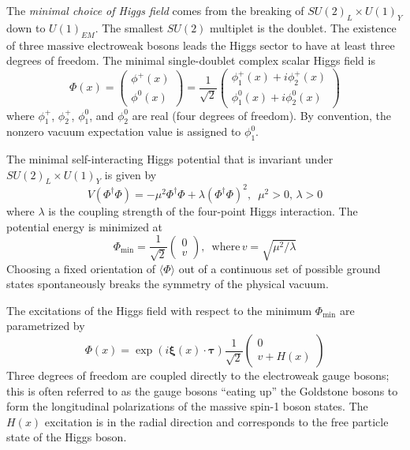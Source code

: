 \documentclass{article}
\begin{document}
The \textit{minimal choice of Higgs field} comes from the breaking of $SU(2)_L \times U(1)_Y$ down to $U(1)_{EM}$. The smallest $SU(2)$ multiplet is the doublet. The existence of three massive electroweak bosons leads the Higgs sector to have at least three degrees of freedom. The minimal single-doublet complex scalar Higgs field is
\begin{equation}
    \Phi(x) = \begin{pmatrix} \phi^+(x) \\ \phi^0(x) \end{pmatrix} 
    = \frac{1}{\sqrt{2}} \begin{pmatrix} \phi_1^+(x) + i\phi_2^+(x) \\ \phi_1^0(x) + i\phi_2^0 (x) \end{pmatrix}
\end{equation}
where $\phi_1^+$, $\phi_2^+$, $\phi_1^0$, and $\phi_2^0$ are real (four degrees of freedom). By convention, the nonzero vacuum expectation value is assigned to $\phi_1^0$.

The minimal self-interacting Higgs potential that is invariant under $SU(2)_L \times U(1)_Y$ is given by
\begin{equation}
    V(\Phi^\dagger \Phi) = -\mu^2 \Phi^\dagger \Phi + \lambda (\Phi^\dagger \Phi)^2, \,\,\, \mu^2 > 0, \, \lambda > 0
\end{equation}
where $\lambda$ is the coupling strength of the four-point Higgs interaction. 
The potential energy is minimized at 
\begin{equation}
    \Phi_{\text{min}} = \frac{1}{\sqrt{2}} \begin{pmatrix} 0 \\ v \end{pmatrix}, \,\,\,\text{where} \, v = \sqrt{\mu^2 / \lambda}
\end{equation}
Choosing a fixed orientation of $\langle \Phi \rangle$ out of a continuous set of possible ground states spontaneously breaks the symmetry of the physical vacuum.

The excitations of the Higgs field with respect to the minimum $\Phi_{\text{min}}$ are parametrized by 
\begin{equation}
    \Phi(x) = \exp(i \boldsymbol{\xi}(x) \cdot \boldsymbol{\tau}) \frac{1}{\sqrt{2}} \begin{pmatrix} 0 \\ v + H(x) \end{pmatrix}
\end{equation}
Three degrees of freedom are coupled directly to the electroweak gauge bosons; this is often referred to as the gauge bosons ``eating up'' the Goldstone bosons to form the longitudinal polarizations of the massive spin-1 boson states. The $H(x)$ excitation is in the radial direction and corresponds to the free particle state of the Higgs boson. 
\end{document}
